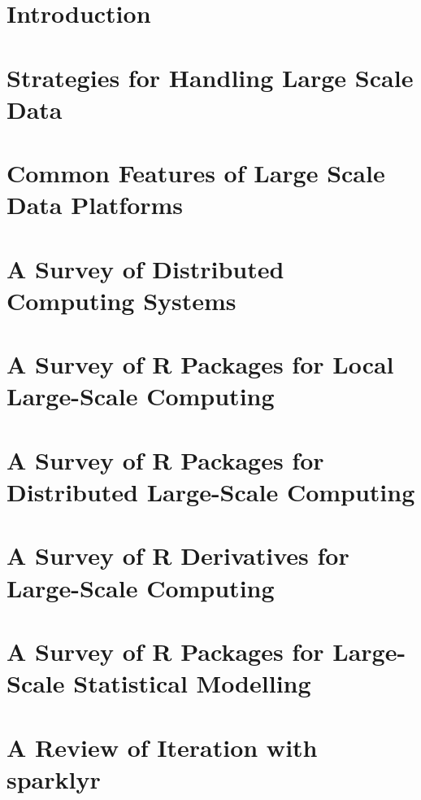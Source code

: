 \section{Introduction}\label{sec:lit-review-intro}

\section{Strategies for Handling Large Scale Data}\label{sec:lit-review-strategies}

\section{Common Features of Large Scale Data Platforms}\label{sec:large-scale-features}

\section{A Survey of Distributed Computing Systems}\label{sec:survey-dist-comp-sys}

\section{A Survey of R Packages for Local Large-Scale Computing}\label{sec:survey-r-local-packages}

\section{A Survey of R Packages for Distributed Large-Scale Computing}\label{sec:survey-r-dist-packages}

\section{A Survey of R Derivatives for Large-Scale Computing}\label{sec:survey-r-deriv}

\section{A Survey of R Packages for Large-Scale Statistical Modelling}\label{sec:survey-r-stat-model-packages}

\section{A Review of Iteration with sparklyr}\label{sec:review-iteration-sparklyr}

